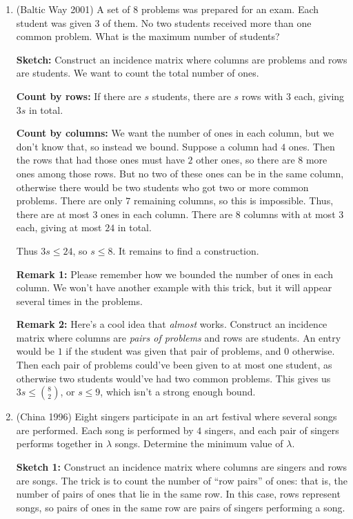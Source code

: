 \documentclass[11pt,paper=letter]{scrartcl}
\newcommand{\cbyrows}{{\bfseries \color{RowBlue} Count by rows: }}
\newcommand{\cbycols}{{\bfseries \color{ColOrange} Count by columns: }}
\begin{document}
\begin{enumerate}

\item (Baltic Way 2001) A set of $8$ problems was prepared for an exam. Each student was given $3$ of them. No two students received more than one common problem. What is the maximum number of students?

\textbf{Sketch:} Construct an incidence matrix where columns are problems and rows are students. We want to count the total number of ones.

\cbyrows If there are $s$ students, there are $s$ rows with $3$ each, giving $3s$ in total.

\cbycols We want the number of ones in each column, but we don't know that, so instead we bound. Suppose a column had $4$ ones. Then the rows that had those ones must have $2$ other ones, so there are $8$ more ones among those rows. But no two of these ones can be in the same column, otherwise there would be two students who got two or more common problems. There are only $7$ remaining columns, so this is impossible. Thus, there are at most $3$ ones in each column. There are $8$ columns with at most $3$ each, giving at most $24$ in total.

Thus $3s \le 24$, so $s \le 8$. It remains to find a construction.

\textbf{Remark 1:} Please remember how we bounded the number of ones in each column. We won't have another example with this trick, but it will appear several times in the problems.

\textbf{Remark 2:} Here's a cool idea that \textit{almost} works. Construct an incidence matrix where columns are \textit{pairs of problems} and rows are students. An entry would be $1$ if the student was given that pair of problems, and $0$ otherwise. Then each pair of problems could've been given to at most one student, as otherwise two students would've had two common problems. This gives us $3s \le \binom 82$, or $s \le 9$, which isn't a strong enough bound.




\item (China 1996) Eight singers participate in an art festival where several songs are performed. Each song is performed by $4$ singers, and each pair of singers performs together in $\lambda$ songs. Determine the minimum value of $\lambda$.

\textbf{Sketch 1:} Construct an incidence matrix where columns are singers and rows are songs. The trick is to count the number of ``row pairs'' of ones: that is, the number of pairs of ones that lie in the same row. In this case, rows represent songs, so pairs of ones in the same row are pairs of singers performing a song.


\end{enumerate}
\end{document}
